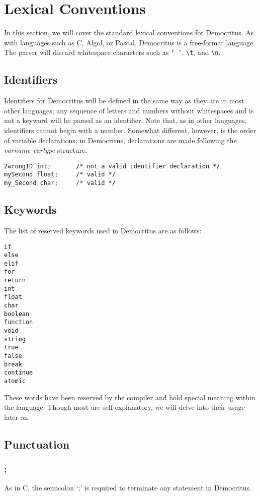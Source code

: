 \chapter{Lexical Conventions}
	In this section, we will cover the standard lexical conventions for Democritus. As with languages such as C, Algol, or Pascal, Democritus is a free-format language. The parser will discard whitespace characters such as \texttt{` '}, \texttt{\textbackslash t}, and \texttt{\textbackslash n}.
	
	\section{Identifiers}
		Identifiers for Democritus will be defined in the same way as they are in most other languages; any sequence of letters and numbers without whitespaces and is not a keyword will be parsed as an identifier. Note that, as in other languages, identifiers cannot begin with a number. Somewhat different, however, is the order of variable declarations; in Democritus, declarations are made following the \textit{varname vartype} structure. 
		
	\begin{lstlisting}
2wrongID int;		/* not a valid identifier declaration */
mySecond float;		/* valid */
my_Second char;		/* valid */
	\end{lstlisting}
	
	\section{Keywords}
		The list of reserved keywords used in Democritus are as follows:
		\begin{lstlisting}[language={}]
if
else
elif
for
return
int
float
char
boolean
function
void
string
true
false
break
continue
atomic
		\end{lstlisting}
		\noindent These words have been reserved by the compiler and hold special meaning within the language. Though most are self-explanatory, we will delve into their usage later on. 
		
	\section{Punctuation}
		\subsection{;}
			As in C, the semicolon `;' is required to terminate any statement in Democritus. 
